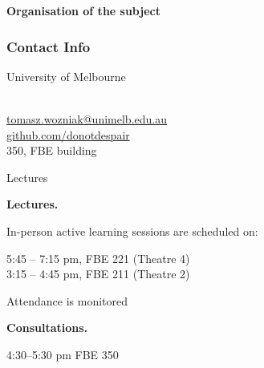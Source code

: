 \documentclass[notes,blackandwhite,mathsans]{beamer}
\begin{document}
{
\begin{frame}

\begin{adjustwidth}{-0.5cm}{0cm}
\vspace{8.3cm}\Large
\textbf{{\color{mcxs2}Organisation} {\color{mcxs1}of the subject}}
\end{adjustwidth}

\end{frame}
}




\begin{frame}
\frametitle{Contact Info}

\hspace{0.3cm}University of Melbourne \\
 \\


\vspace{0.5cm}
 \href{mailto:tomasz.wozniak@unimelb.edu.au}{tomasz.wozniak@unimelb.edu.au}\\
 {\color{mcxs2}\href{https://github.com/donotdespair}{github.com/donotdespair}}\\

\vspace{0.5cm}
 350{\color{mcxs3}, FBE building}

\end{frame}



\begin{frame}{Lectures}

\textbf{Lectures.}

\smallskip In-person active learning sessions are scheduled on:

\smallskip
{} 5:45 – 7:15 pm, FBE 221 (Theatre 4) \\
  3:15 – 4:45 pm, FBE 211 (Theatre 2)

\smallskip Attendance is monitored

\bigskip\textbf{Consultations.}


\smallskip
{} 4:30--5:30 pm {\color{mcxs2} FBE 350}


\end{frame}
\end{document}
